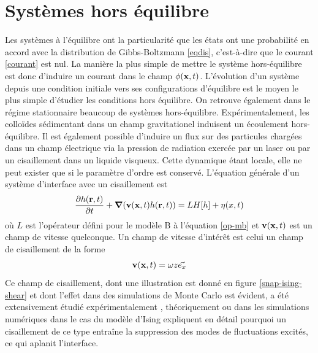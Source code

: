     \section{Systèmes hors équilibre}

Les systèmes à l'équilibre ont la particularité que les états ont une probabilité en accord avec la distribution de Gibbs-Boltzmann \ref{eqdis}, c'est-à-dire que le courant \ref{courant} est nul. La manière la plus simple de mettre le système hors-équilibre est donc d'induire un courant dans le champ $\phi({\bf x},t)$. L'évolution d'un système depuis une condition initiale vers ses configurations d'équilibre est le moyen le plus simple d'étudier les conditions hors équilibre. On retrouve également dans le régime stationnaire beaucoup de systèmes hors-équilibre. Expérimentalement, les colloïdes sédimentant dans un champ gravitationel induisent un écoulement hors-équilibre. Il est également possible d'induire un flux sur des particules chargées dans un champ électrique via la pression de radiation exercée par un laser ou par un cisaillement dans un liquide visqueux\cite{girot_conical_2019}. Cette dynamique étant locale, elle ne peut exister que si le paramètre d'ordre est conservé. L'équation générale d'un système d'interface avec un cisaillement est\cite{bray_interface_2001-1,bray_interface_2001}
\begin{align}
     \frac{\partial h({\bf r},t)}{\partial t} + {\boldsymbol \nabla} ({\bf v}({\bf x},t) h({\bf r},t)) =  L H[h] +  \eta(x,t)
\end{align}
où $L$ est l'opérateur défini pour le modèle B à l'équation \ref{op-mb} et ${\bf v}({\bf x},t)$ est un champ de vitesse quelconque. 
Un champ de vitesse d'intérêt est celui un champ de cisaillement de la forme 
\begin{align}
    {\bf v}({\bf x},t) = \omega z \vec{e_x}
     \label{eq-cisaillement}    
\end{align}
Ce champ de cisaillement, dont une illustration est donné en figure \ref{snap-ising-shear} et dont l'effet dans des simulations de Monte Carlo est évident, a été extensivement étudié expérimentalement \cite{derks_suppression_2006}, théoriquement \cite{leung_field_1986,bray_coarsening_2000,bray_interface_2001-1,bray_interface_2001} ou dans les simulations numériques dans le cas du modèle d'Ising \cite{gonnella_nonequilibrium_2009,smith_driven_2010,smith_interfaces_2008,sadhu_non-local_2014,cohen_interface_2016,cirillo_monte_2005} expliquent en détail pourquoi un cisaillement de ce type entraîne la suppression des modes de fluctuations excités, ce qui aplanit l'interface. 

